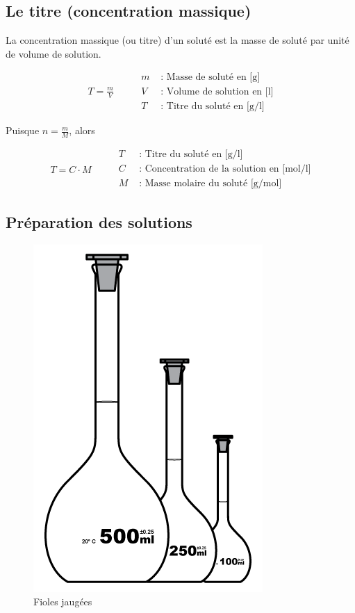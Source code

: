 \documentclass[
  11pt,
  french,
  a4paper,
  openany]{book}
\begin{document}
\hypertarget{le-titre-concentration-massique}{%
\subsection{Le titre (concentration massique)}\label{le-titre-concentration-massique}}

La concentration massique (ou titre) d'un soluté est la masse de soluté par unité de volume de solution.

\[
\begin{split}
  T = \frac{m}{V}
\end{split}
\qquad
\begin{split}
  m &\text{ : Masse de soluté en [g]} \\
  V &\text{ : Volume de solution en [l]} \\
  T &\text{ : Titre du soluté en [g/l]}
\end{split}
\]

Puisque \(n = \frac{m}{M}\), alors

\[
\begin{split}
  T = C \cdot M
\end{split}
\qquad
\begin{split}
  T &\text{ : Titre du soluté en [g/l]} \\
  C &\text{ : Concentration de la solution en [mol/l]} \\
  M &\text{ : Masse molaire du soluté [g/mol]}
\end{split}
\]

\hypertarget{pruxe9paration-des-solutions}{%
\subsection{Préparation des solutions}\label{pruxe9paration-des-solutions}}

\begin{figure}

{\centering \includegraphics[width=0.2\linewidth]{images/fiole} 

}

\caption{Fioles jaugées}\label{fig:fiole}
\end{figure}
\end{document}
